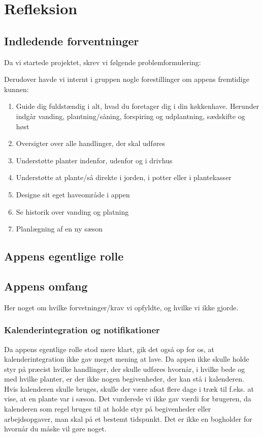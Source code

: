 \section{Refleksion}

\subsection{Indledende forventninger}
Da vi startede projektet, skrev vi følgende problemformulering:
\medskip


Derudover havde vi internt i gruppen nogle forestillinger om appens fremtidige kunnen:

\begin{enumerate}
    \item Guide dig fuldstændig i alt, hvad du foretager dig i din køkkenhave. Herunder indgår vanding, plantning/såning, forspiring og udplantning, sædskifte og høst
    \item Oversigter over alle handlinger, der skal udføres
    \item Understøtte planter indenfor, udenfor og i drivhus
    \item Understøtte at plante/så direkte i jorden, i potter eller i plantekasser
    \item Designe sit eget haveområde i appen
    \item Se historik over vanding og platning
    \item Planlægning af en ny sæson
\end{enumerate}

\subsection{Appens egentlige rolle}

\subsection{Appens omfang}
Her noget om hvilke forvetninger/krav vi opfyldte, og hvilke vi ikke gjorde.

\subsubsection{Kalenderintegration og notifikationer}
Da appens egentlige rolle stod mere klart, gik det også op for os, at kalenderintegration ikke gav meget mening at lave. Da appen ikke skulle holde styr på præcist hvilke handlinger, der skulle udføres hvornår, i hvilke bede og med hvilke planter, er der ikke nogen begivenheder, der kan stå i kalenderen. Hvis kalenderen skulle bruges, skulle der være afsat flere dage i træk til f.eks. at vise, at en plante var i sæson. Det vurderede vi ikke gav værdi for brugeren, da kalenderen som regel bruges til at holde styr på begivenheder eller arbejdsopgaver, man skal på et bestemt tidspunkt. Det er ikke en bogholder for hvornår du måske vil gøre noget.


